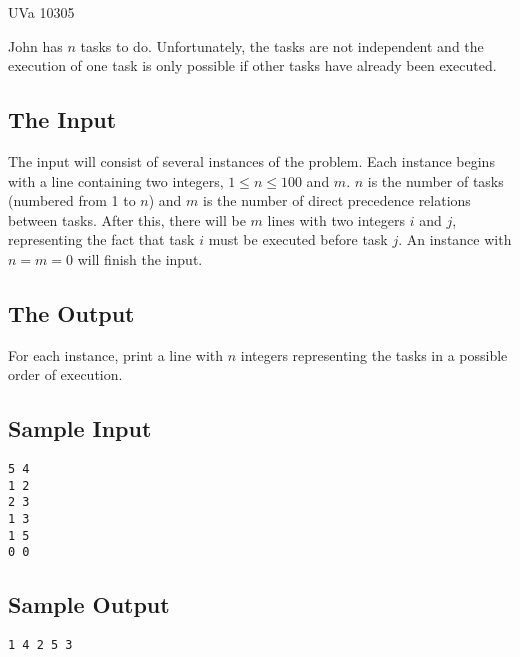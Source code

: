 
\noindent
UVa 10305\bigskip

John has $n$ tasks to do.
Unfortunately, the tasks are not independent and the execution of one task is only
possible if other tasks have already been executed. 


\subsection*{The Input}

The input will consist of several instances of
the problem. Each instance begins with a line containing two integers, $1\leq n\leq 100$ and $m$. $n$
is the number of tasks (numbered from 1
to $n$) and $m$ is the number of direct precedence relations between tasks. After
this, there will be $m$ lines with two
integers $i$ and $j$, representing the fact that task $i$ must be executed before task $j$.
An instance with $n = m = 0$ will
finish the input. 


\subsection*{The Output}

For each instance,
print a line with $n$ integers representing the tasks in a possible order of execution.



\subsection*{Sample Input}
\begin{verbatim}
5 4
1 2
2 3
1 3
1 5
0 0
\end{verbatim}

\subsection*{Sample Output}
\begin{verbatim}
1 4 2 5 3
\end{verbatim}
